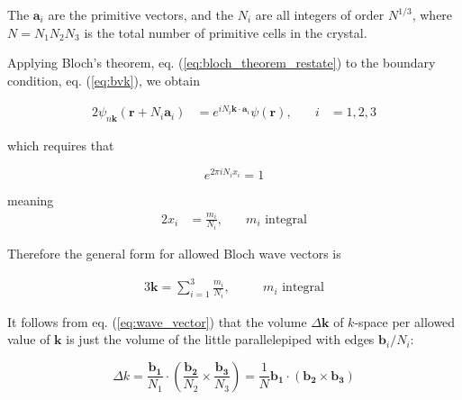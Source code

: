The $\boldsymbol{a}_i$ are the primitive vectors, and the $N_i$ are all integers of order $N^{1/3}$, where $N=N_1N_2N_3$ is the total number of primitive cells in the crystal.

Applying Bloch's theorem, eq. (\ref{eq:bloch_theorem_restate}) to the boundary condition, eq. (\ref{eq:bvk}),  we obtain

\begin{alignat}{2}\label{eq:bloch_applied}
	\psi_{n\boldsymbol{k}}
	(\boldsymbol{r} + N_i \boldsymbol{a}_i)
	&= 
	e^{i N_i \boldsymbol{k} \cdot \boldsymbol{a}_i}
	\psi(\boldsymbol{r}),
	&\quad
	i &= 1,2,3
\end{alignat}

which requires that

\begin{equation} \label{eq:requirement}
	e^{2 \pi i N_i x_i} = 1
\end{equation}

meaning
\begin{alignat}{2} \label{eq:xi}
	x_i &= \frac{m_i}{N_i},
	& \quad
	m_i\text{ integral}
\end{alignat}


Therefore the general form for allowed Bloch wave vectors is

\begin{alignat}{3} \label{eq:wave_vector}
	\boldsymbol{k} =
	\sum_{i=1}^{3} \frac{m_i}{N_i},
	&\quad 
	&m_i\text{ integral}
\end{alignat}

It follows from eq. (\ref{eq:wave_vector}) that the volume $\Delta\boldsymbol{k}$ of $k$-space per allowed value of $\boldsymbol{k}$ is just the volume of the little parallelepiped with edges $\boldsymbol{b}_i/N_i$:

\begin{equation} \label{eq:deltak}
	\Delta{k}
	= 
	\frac{\boldsymbol{b_1}}{N_1}
	\cdot
	\left(
	\frac{\boldsymbol{b_2}}{N_2}
	\times
	\frac{\boldsymbol{b_3}}{N_3}
	\right)
	=
	\frac{1}{N}
	\boldsymbol{b_1}
	\cdot
	\left(
	\boldsymbol{b_2}
	\times
	\boldsymbol{b_3}
	\right)
\end{equation}














